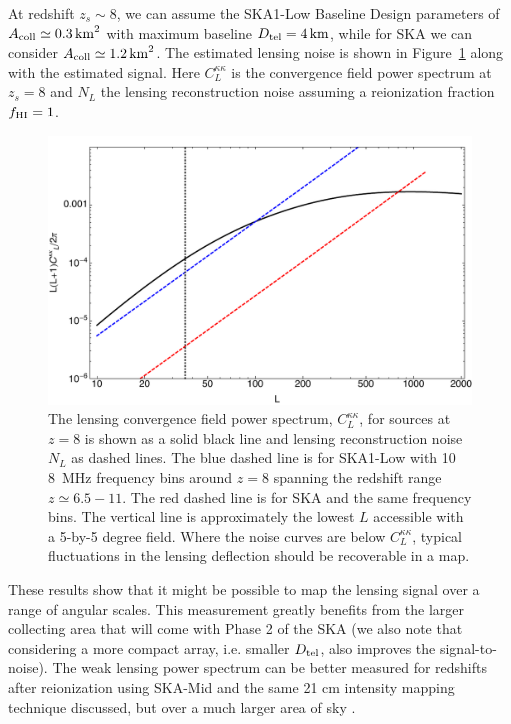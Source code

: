 \documentclass{PoS}
\begin{document}
At redshift $z_s \sim 8$, we can assume the SKA1-Low Baseline Design \citep{Dewdney:2013} parameters of $A_{\rm coll} \simeq 0.3  \, {\rm km}^2$ with maximum baseline $D_{\rm tel}=4 \, {\rm km}$, while for SKA we can consider $A_{\rm coll} \simeq 1.2  \, {\rm km}^2$.
The estimated lensing noise is shown in Figure~\ref{fig:CLNL} along with the estimated signal.  
Here $C^{\kappa \kappa}_L$ is the convergence field power spectrum at $z_s=8$ and $N_L$ the lensing reconstruction noise assuming a reionization fraction $f_{\rm HI}=1$.
\begin{figure}[h]
\centerline{
\includegraphics[scale=0.5]{figures/tomographic_SKA_kappaPS.pdf}
}
\caption{The lensing convergence field power spectrum, $C^{\kappa \kappa}_L$, for sources at $z=8$ is shown as a solid black line and lensing reconstruction noise $N_L$ as dashed lines.  The blue dashed line is for SKA1-Low with 10 8~MHz frequency bins around $z=8$ spanning the redshift range $z \simeq 6.5-11$.  The red dashed line is for SKA and the same frequency bins. The vertical line is approximately the lowest $L$ accessible with a 5-by-5 degree field.  Where the noise curves are below $C^{\kappa \kappa}_L$, typical fluctuations in the lensing deflection should be recoverable in a map. }
\label{fig:CLNL}
\end{figure}

These results show that it might be possible to map the lensing signal over a range of angular scales.  This measurement greatly benefits from the larger collecting area that will come with Phase 2 of the SKA (we also note that  considering a more compact array, i.e. smaller $D_{\rm tel}$, also improves the signal-to-noise).  The weak lensing power spectrum can be better measured for redshifts after reionization using SKA-Mid and the same 21 cm intensity mapping technique discussed, but over a much larger area of sky \citep{PourtsidouMetcalf:2014}.
\end{document}
